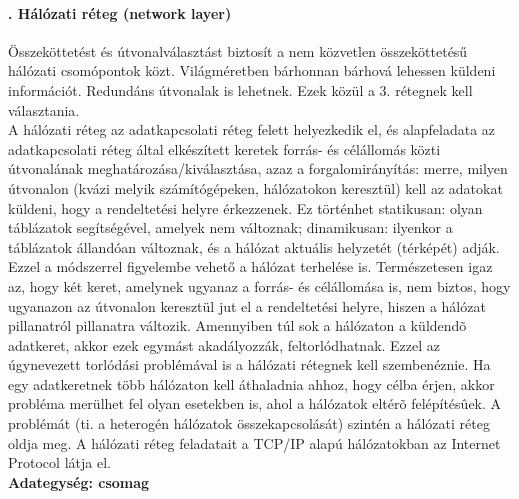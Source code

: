 \paragraph[Hálózati réteg]{. Hálózati réteg (network layer)}
Összeköttetést és útvonalválasztást biztosít a nem közvetlen összeköttetésű hálózati csomópontok közt. Világméretben bárhonnan bárhová lehessen küldeni információt. Redundáns útvonalak is lehetnek. Ezek közül a 3. rétegnek kell választania.\\
{\footnotesize A hálózati réteg az adatkapcsolati réteg felett helyezkedik el, és alapfeladata az adatkapcsolati réteg által elkészített keretek forrás- és célállomás közti útvonalának meghatározása/kiválasztása, azaz a forgalomirányítás: merre, milyen útvonalon (kvázi melyik számítógépeken, hálózatokon keresztül) kell az adatokat küldeni, hogy a rendeltetési helyre érkezzenek. Ez történhet statikusan: olyan táblázatok segítségével, amelyek nem változnak; dinamikusan: ilyenkor a táblázatok állandóan változnak, és a hálózat aktuális helyzetét (térképét) adják. Ezzel a módszerrel figyelembe vehető a hálózat terhelése is. Természetesen igaz az, hogy két keret, amelynek ugyanaz a forrás- és célállomása is, nem biztos, hogy ugyanazon az útvonalon keresztül jut el a rendeltetési helyre, hiszen a hálózat pillanatról pillanatra változik. Amennyiben túl sok a hálózaton a küldendõ adatkeret, akkor ezek egymást akadályozzák, feltorlódhatnak. Ezzel az úgynevezett torlódási problémával is a hálózati rétegnek kell szembenéznie. Ha egy adatkeretnek több hálózaton kell áthaladnia ahhoz, hogy célba érjen, akkor probléma merülhet fel olyan esetekben is, ahol a hálózatok eltérõ felépítésûek. A problémát (ti. a heterogén hálózatok összekapcsolását) szintén a hálózati réteg oldja meg. A hálózati réteg feladatait a TCP/IP alapú hálózatokban az Internet Protocol látja el.}\\
\textbf{Adategység: csomag}
